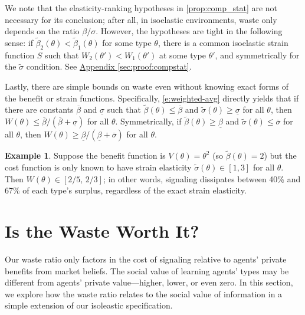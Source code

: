 \documentclass[12 pt]{article}
\newcommand{\appendixref}[1]{\hyperref[#1]{Appendix \ref{#1}}}
\theoremstyle{remark}
\theoremstyle{definition}
\newtheorem{example}{Example}
\newcommand{\elaB}{\tilde\beta}   %
\newcommand{\elaS}{\tilde\sigma}  %
\begin{document}
We note that the elasticity-ranking hypotheses in \autoref{prop:comp_stat} are not necessary for its conclusion; after all, in isoelastic environments, waste only depends on the ratio $\beta/\sigma$. However, the hypotheses are tight in the following sense: if $\elaB_2 (\theta)< \elaB_1(\theta)$ for some type $\theta$, there is a common isoelastic strain function $S$ such that $W_2 (\theta')< W_1(\theta')$ at some type $\theta'$, and symmetrically for the $\elaS$ condition. See \appendixref{sec:proof:compstat}.

Lastly, there are simple bounds on waste even without knowing exact forms of the benefit or strain functions. Specifically, \autoref{e:weighted-avg} directly yields that if there are constants $\overline \beta$ and $\underline \sigma$ such that $\elaB(\theta) \leq \overline{\beta}$ and $\elaS(\theta) \geq \underline{\sigma}$ for all $\theta$, then $W(\theta) \leq \overline{\beta}/(\overline{\beta}+\underline{\sigma})$ for all $\theta$. Symmetrically, if $\elaB(\theta) \geq \underline{\beta}$ and $\elaS(\theta) \leq \overline{\sigma}$ for all $\theta$, then $W(\theta) \geq \underline{\beta}/(\underline{\beta}+\overline{\sigma})$ for all $\theta$.

\begin{example}
Suppose the benefit function is $V(\theta) = \theta^2$ (so $\elaB(\theta) = 2$) but the cost function is only known to have strain elasticity $\elaS(\theta) \in [1,3]$ for all $\theta$. Then %
$W(\theta) \in [2/5,\, 2/3]$; in other words, signaling dissipates between 40\% and 67\% of each type's surplus, regardless of the exact strain elasticity.
\end{example}



\section{Is the Waste Worth It?}
\label{sec:welfare}


Our waste ratio only factors in the cost of signaling relative to agents' private benefits from %
market beliefs. 
The social value of learning agents' types may be different from agents' private value---higher, lower, or even zero. In this section, we explore how the waste ratio relates to the social value of information in a simple %
extension of our isoleastic specification. 
\end{document}
